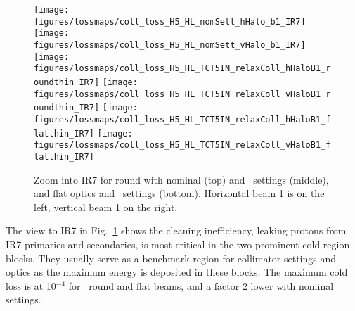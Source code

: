 

\begin{figure}[!htb]
\begin{center}
\texttt{[image: figures/lossmaps/coll\_loss\_H5\_HL\_nomSett\_hHalo\_b1\_IR7]}
\texttt{[image: figures/lossmaps/coll\_loss\_H5\_HL\_nomSett\_vHalo\_b1\_IR7]}
\texttt{[image: figures/lossmaps/coll\_loss\_H5\_HL\_TCT5IN\_relaxColl\_hHaloB1\_roundthin\_IR7]}
\texttt{[image: figures/lossmaps/coll\_loss\_H5\_HL\_TCT5IN\_relaxColl\_vHaloB1\_roundthin\_IR7]}
\texttt{[image: figures/lossmaps/coll\_loss\_H5\_HL\_TCT5IN\_relaxColl\_hHaloB1\_flatthin\_IR7]}
\texttt{[image: figures/lossmaps/coll\_loss\_H5\_HL\_TCT5IN\_relaxColl\_vHaloB1\_flatthin\_IR7]}
\end{center}
\vspace{-0.3cm}
 \caption{Zoom into IR7 for round with nominal (top) and \twosigmaret~settings (middle), and flat optics and \twosigmaret~settings (bottom). Horizontal beam 1 is on the left, vertical beam 1 on the right.
  \label{IR7_zooms}}
\end{figure}

The view to IR7 in Fig.~\ref{IR7_zooms} shows the cleaning inefficiency, leaking protons from IR7 primaries and secondaries, is most critical in the two prominent cold region blocks. They usually serve as a benchmark region for collimator settings and optics as the maximum energy is deposited in these blocks. The maximum cold loss is at 10$^{-4}$ for \twosigmaret~round and flat beams, and a factor 2 lower with nominal settings.

